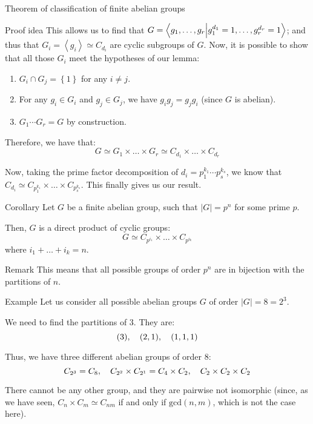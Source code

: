 \documentclass[a4paper]{article}
\begin{document}
\begin{parag}{Theorem of classification of finite abelian groups}
\begin{subparag}{Proof idea}
        This allows us to find that $G = \braket{g_1,\ldots,g_r}{g_1^{d_1} = 1, \ldots, g_r^{d_r} = 1}$; and thus that $G_i = \left\langle g_i \right\rangle \simeq C_{d_i}$ are cyclic subgroups of $G$. Now, it is possible to show that all those $G_i$ meet the hypotheses of our lemma: 
        \begin{enumerate}
            \item $G_i \cap G_j = \left\{1\right\}$ for any $i \neq j$.
            \item For any $g_i \in G_i$ and $g_j \in G_j$, we have $g_i g_j = g_j g_i$ (since $G$ is abelian).
            \item $G_1 \cdots G_r = G$ by construction.
        \end{enumerate}

        Therefore, we have that: 
        \[G \simeq G_1 \times \ldots \times G_r \simeq C_{d_1} \times \ldots \times C_{d_r}\]

        Now, taking the prime factor decomposition of $d_i = p_1^{k_1}\cdots p_s^{k_s}$, we know that $C_{d_i} \simeq C_{p_1^{k_1}} \times \ldots \times C_{p_s^{k_s}}$. This finally gives us our result.
    \end{subparag}
\end{parag}

\begin{parag}{Corollary}
    Let $G$ be a finite abelian group, such that $\left|G\right| = p^n$ for some prime $p$.

    Then, $G$ is a direct product of cyclic groups: 
    \[G \simeq C_{p^{i_1}} \times \ldots \times C_{p^{i_k}}\]
    where $i_1 + \ldots + i_k = n$.

    \begin{subparag}{Remark}
        This means that all possible groups of order $p^n$ are in bijection with the partitions of $n$.
    \end{subparag}

    \begin{subparag}{Example}
        Let us consider all possible abelian groups $G$ of order $\left|G\right| = 8 = 2^3$.

        We need to find the partitions of $3$. They are: 
        \[\left(3\right), \mathspace \left(2, 1\right), \mathspace \left(1, 1, 1\right)\]

        Thus, we have three different abelian groups of order $8$: 
        \[C_{2^3} = C_8, \quad C_{2^2} \times C_{2^1} = C_4 \times C_2, \quad C_2 \times C_2 \times C_2\]

        There cannot be any other group, and they are pairwise not isomorphic (since, as we have seen, $C_n \times C_m \simeq C_{nm}$ if and only if $\text{gcd}\left(n, m\right)$, which is not the case here).
    \end{subparag}
\end{parag}
\end{document}
